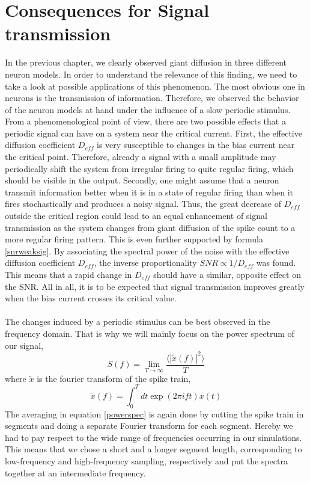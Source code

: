 \documentclass[12pt,a4paper]{article}
\begin{document}
\section{Consequences for Signal transmission}\label{con}
In the previous chapter, we clearly observed giant diffusion in three different neuron models. In order to understand the relevance of this finding, we need to take a look at possible applications of this phenomenon. The most obvious one in neurons is the transmission of information. Therefore, we observed the behavior of the neuron models at hand under the influence of a slow periodic stimulus.
\\
From a phenomenological point of view, there are two possible effects that a periodic signal can have on a system near the critical current. First, the effective diffusion coefficient $D_{eff}$ is very susceptible to changes in the bias current near the critical point. Therefore, already a signal with a small amplitude may periodically shift the system from irregular firing to quite regular firing, which should be visible in the output.
Secondly, one might assume that a neuron transmit information better when it is in a state of regular firing than when it fires stochastically and produces a noisy signal. Thus, the great decrease of $D_{eff}$ outside the critical region could lead to an equal enhancement of signal transmission as the system changes from giant diffusion of the spike count to a more regular firing pattern.
This is even further supported by formula \ref{snrweaksig}. By associating the spectral power of the noise with the effective diffusion coefficient $D_{eff}$, the inverse proportionality $SNR\propto1/D_{eff}$ was found. This means that a rapid change in $D_{eff}$ should have a similar, opposite effect on the SNR.
All in all, it is to be expected that signal transmission improves greatly when the bias current crosses its critical value.\\\\
The changes induced by a periodic stimulus can be best observed in the frequency domain. That is why we will mainly focus on the power spectrum of our signal,
\begin{equation}\label{powerspec}
S(f)=\lim_{T\rightarrow\infty}\frac{\langle|\tilde{x}(f)|^2\rangle}{T}
\end{equation}
where $\tilde{x}$ is the fourier transform of the spike train,
\begin{equation}
\tilde{x}(f)=\int_{0}^{T}dt \exp(2\pi ift)x(t)
\end{equation}
The averaging in equation \ref{powerspec} is again done by cutting the spike train in segments and doing a separate Fourier transform for each segment. Hereby we had to pay respect to the wide range of frequencies occurring in our simulations. This means that we chose a short and a longer segment length, corresponding to low-frequency and high-frequency sampling, respectively and put the spectra together at an intermediate frequency.
\end{document}
